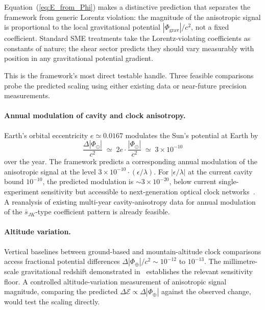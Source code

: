 \documentclass[a4paper,fleqn]{cas-dc}
\theoremstyle{thmstyleone}%
\theoremstyle{thmstyletwo}%
\begin{document}
Equation~(\ref{eq:E_from_Phi}) makes a distinctive prediction
that separates the framework from generic Lorentz violation:
the magnitude of the anisotropic signal is proportional to the
local gravitational potential $|\Phi_{\mathrm{grav}}|/c^2$,
not a fixed coefficient. Standard SME treatments take the
Lorentz-violating coefficients as constants of nature; the
shear sector predicts they should vary measurably with
position in any gravitational potential gradient.

This is the framework's most direct testable handle. Three
feasible comparisons probe the predicted scaling using either
existing data or near-future precision measurements.

\paragraph{Annual modulation of cavity and clock anisotropy.}
Earth's orbital eccentricity $e\simeq 0.0167$ modulates the
Sun's potential at Earth by
\begin{equation}
    \frac{\Delta|\Phi_{\odot}|}{c^2}
    \;\simeq\;
    2e\cdot\frac{|\Phi_{\odot}|}{c^2}
    \;\simeq\;
    3\times 10^{-10}
\end{equation}
over the year. The framework predicts a corresponding annual
modulation of the anisotropic signal at the level
$3\times 10^{-10}\cdot(\epsilon/\lambda)$. For
$|\epsilon/\lambda|$ at the current cavity bound $10^{-10}$,
the predicted modulation is $\sim 3\times 10^{-20}$, below
current single-experiment sensitivity but accessible to
next-generation optical clock networks~\cite{Bothwell2022,
Sanner2019}. A reanalysis of existing multi-year
cavity-anisotropy data for annual modulation of the
$\bar{s}_{JK}$-type coefficient pattern is already feasible.

\paragraph{Altitude variation.}
Vertical baselines between ground-based and mountain-altitude
clock comparisons access fractional potential differences
$\Delta|\Phi_{\oplus}|/c^2\sim 10^{-12}$ to $10^{-13}$. The
millimetre-scale gravitational redshift demonstrated
in~\cite{Bothwell2022} establishes the relevant sensitivity
floor. A controlled altitude-variation measurement of
anisotropic signal magnitude, comparing the predicted
$\Delta\mathcal{E}\propto\Delta|\Phi_{\oplus}|$ against the
observed change, would test the scaling directly.
\end{document}
